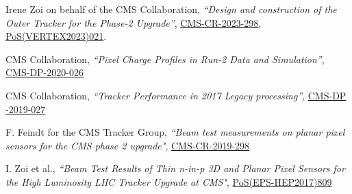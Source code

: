 \begin{refsection}
      \vspace{2mm}
      \onehalfspacing
Irene Zoi on behalf of the CMS Collaboration, {\sl ``Design and construction of the Outer Tracker for the Phase-2 Upgrade''},
\href{https://cds.cern.ch/record/2885850?ln=en}{CMS-CR-2023-298},
\href{https://doi.org/10.22323/1.448.0021}{PoS(VERTEX2023)021}.
    \end{refsection}

  
    \begin{refsection}
      \vspace{2mm}
      \onehalfspacing
CMS Collaboration, {\sl ``Pixel Charge Profiles in Run-2 Data and Simulation''},
\href{https://cds.cern.ch/record/2720551/files/DP2020_026.pdf}{CMS-DP-2020-026}
    \end{refsection}

      \begin{refsection}
      \vspace{2mm}
      \onehalfspacing
CMS Collaboration, {\sl ``Tracker Performance in 2017 Legacy processing''},
\href{http://cds.cern.ch/record/2689892/files/DP2019_027.pdf}{CMS-DP -2019-027}
    \end{refsection}


    \begin{refsection}
      \vspace{2mm}
      \onehalfspacing
       F. Feindt for the CMS Tracker Group, {\sl ``Beam test measurements on planar pixel sensors for the CMS phase 2 upgrade"}, \href{http://cds.cern.ch/record/2713732}{CMS-CR-2019-298}
    \end{refsection}
  


     
        \begin{refsection}
      \vspace{2mm}
      \onehalfspacing
      I. Zoi et al., {\sl ``Beam Test Results of Thin n-in-p 3D and Planar Pixel Sensors for the High Luminosity LHC Tracker Upgrade at CMS"}, \href{https://doi.org/10.22323/1.314.0809}{PoS(EPS-HEP2017)809}
    \end{refsection}


 
